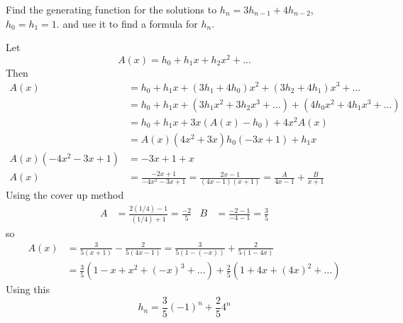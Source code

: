\documentclass[12pt]{article}
\newenvironment{exercise}[2][Exercise]{\begin{trivlist}
\item[\hskip \labelsep {\bfseries #1} \hskip \labelsep {\bfseries #2.}]}{\end{trivlist}}
\begin{document}
\begin{exercise}{3.4.2 (1pt)}
	Find the generating function for the solutions to $h_n = 3h_{n-1} + 4h_{n-2}$, $h_0 = h_1 = 1$. and use it to find a formula for $h_n$.
\end{exercise}	
Let 
\[
	A(x) = h_0  + h_1x + h_2x^2 + \ldots
\]
Then
\begin{align*}
	A(x) &= h_0 + h_1x + (3h_1 + 4h_0)x^2 + (3h_2 + 4h_1)x^3 + \ldots \\
	     &= h_0 + h_1x + (3h_1x^2 + 3h_2x^3 + \ldots) + (4h_0x^2 + 4h_1x^3 + \ldots) \\
	     &= h_0 + h_1x + 3x(A(x) - h_0) + 4x^2A(x) \\
	     &= A(x)(4x^2 + 3x) h_0(-3x + 1) + h_1x \\
	A(x)(-4x^2 -3x + 1) &= -3x + 1 + x \\
	A(x) &= \frac{-2x + 1}{-4x^2 -3x + 1} = \frac{2x - 1}{(4x -1)(x + 1)} = \frac{A}{4x - 1} + \frac{B}{x + 1}
\end{align*}
Using the cover up method
\begin{align*}
	A &= \frac{2(1/4) - 1}{(1/4) + 1} = \frac{-2}{5} & B &= \frac{-2 - 1}{-4 - 1} = \frac{3}{5}
\end{align*}
so
\begin{align*}
	A(x) &= \frac{3}{5(x+1)} - \frac{2}{5(4x - 1)} = \frac{3}{5(1 - (-x))} + \frac{2}{5(1 - 4x)} \\
	     &= \frac{3}{5}(1 - x + x^2 +(-x)^3 + \ldots) + \frac{2}{5}(1 + 4x + (4x)^2 + \ldots)
\end{align*}
Using this
\[
	h_n = \frac{3}{5}(-1)^n + \frac{2}{5}4^n
\]
\end{document}
